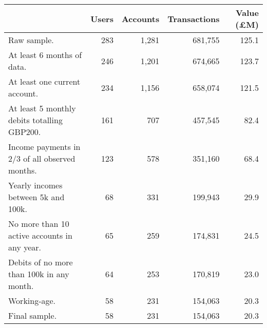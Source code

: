 \begin{tabular}{lrrrr}
\toprule
                                               & Users & Accounts & Transactions & Value (\pounds M) \\
\midrule
                                   Raw sample. &   283 &    1,281 &      681,755 &             125.1 \\
                    At least 6 months of data. &   246 &    1,201 &      674,665 &             123.7 \\
                 At least one current account. &   234 &    1,156 &      658,074 &             121.5 \\
   At least 5 monthly debits totalling GBP200. &   161 &      707 &      457,545 &              82.4 \\
Income payments in 2/3 of all observed months. &   123 &      578 &      351,160 &              68.4 \\
           Yearly incomes between 5k and 100k. &    68 &      331 &      199,943 &              29.9 \\
  No more than 10 active accounts in any year. &    65 &      259 &      174,831 &              24.5 \\
     Debits of no more than 100k in any month. &    64 &      253 &      170,819 &              23.0 \\
                                  Working-age. &    58 &      231 &      154,063 &              20.3 \\
                                 Final sample. &    58 &      231 &      154,063 &              20.3 \\
\bottomrule
\end{tabular}
